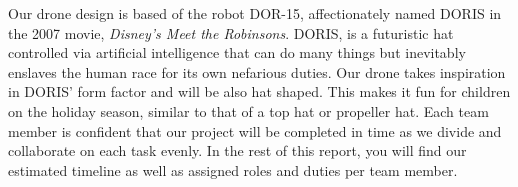 
Our drone design is based of the robot DOR-15, affectionately named DORIS in the 2007 movie, \textit{Disney's Meet the Robinsons}. DORIS, is a futuristic hat controlled via artificial intelligence that can do many things but inevitably enslaves the human race for its own nefarious duties. Our drone takes inspiration in DORIS' form factor and will be also hat shaped. This makes it fun for children on the holiday season, similar to that of a top hat or propeller hat. Each team member is confident that our project will be completed in time as we divide and collaborate on each task evenly. In the rest of this report, you will find our estimated timeline as well as assigned roles and duties per team member.\par
